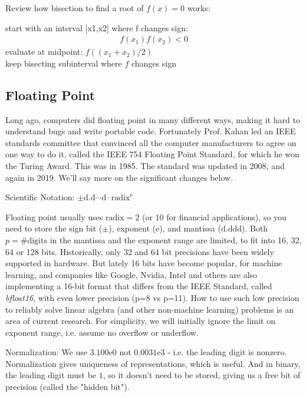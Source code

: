 \documentclass[11pt]{article}
\numberwithin{equation}{section}
\begin{document}
\begin{example}
    Review how bisection to find a root of $f(x)=0$ works:
    \begin{algorithmfrm}
        start with an interval [x1,x2] where f changes sign: \begin{align*}
            f(x_1)f(x_2) < 0
        \end{align*} 
        evaluate at midpoint: $f((x_1+x_2)/2)$\\
        keep bisecting subinterval where $f$ changes sign
    \end{algorithmfrm}
\end{example}

\subsection{Floating Point}
Long ago, computers did floating point in many different ways, making it hard to understand bugs and write portable code. 
Fortunately Prof. Kahan led an IEEE standards committee that convinced all the computer manufacturers to agree on one way to do it, 
called the IEEE 754 Floating Point Standard, for which he won the Turing Award. This was in 1985. The standard was updated in 2008, and again in 2019.
We'll say more on the significant changes below. 

Scientific Notation: $\pm \mathrm{d.d}\cdots \mathrm{d} \cdot \mathrm{radix}^\mathrm{e}$

Floating point usually uses $\mathrm{radix}=2$ (or $10$ for financial applications), so you need to store the sign bit ($\pm$), exponent ($\mathrm{e}$), 
and mantissa ($\mathrm{d.ddd}$). Both $p = \#\mathrm{digits}$ in the mantissa and the exponent range are limited, to fit into 16, 32, 64 or 128 bits. 
Historically, only 32 and 64 bit precisions have been widely supported in hardware. But lately 16 bits have become popular, for machine learning, 
and companies like Google, Nvidia, Intel and others are also implementing a 16-bit format that differs from the IEEE Standard, called \textit{bfloat16},
with even lower precision (p=8 vs p=11). How to use such low precision to reliably solve linear algebra (and other non-machine learning) problems is an area of current research.
For simplicity, we will initially ignore the limit on exponent range, i.e. assume no overflow or underflow.

Normalization: We use $3.100\mathrm{e}0$ not $0.0031\mathrm{e}3$ - i.e. the leading digit is nonzero. Normalization gives uniqueness of representations, which is useful. 
And in binary, the leading digit must be $1$, so it doesn't need to be stored, giving us a free bit of precision (called the "hidden bit").
\end{document}
